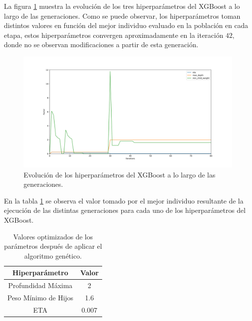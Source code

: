 \documentclass{uathesis-es}
\begin{document}
{La figura \ref{EvolucionHiperparametrosImage} muestra la evolución de  los tres hiperparámetros del XGBoost a lo largo de las generaciones. Como se puede observar, los hiperparámetros toman distintos valores en función del mejor individuo evaluado en la población en cada etapa, estos hiperparámetros convergen aproximadamente en la iteración $42$, donde no se observan modificaciones a partir de esta generación.

 \begin{figure}[H]
	     \centering
	     \includegraphics[width=14cm]{Figures/1stPaper/EvolutionH.png}
	     \caption{Evolución de los hiperparámetros del XGBoost a lo largo de las generaciones.}
	     \label{EvolucionHiperparametrosImage}
 \end{figure}

En la tabla \ref{BestGASolutionTable} se observa el valor tomado por el mejor individuo resultante de la ejecución de las distintas generaciones para cada uno de los hiperparámetros del XGBoost. 

\begin{table}[h]
	\centering
	\begin{tabular}{ |c|c| } 
		\hline
		\textbf{Hiperparámetro} & \textbf{Valor}\\
		\hline
		Profundidad Máxima & 2 \\
		Peso Mínimo de Hijos & 1.6 \\ 
		ETA & 0.007 \\
		\hline
	\end{tabular}
	\caption{Valores optimizados de los parámetros después de aplicar el algoritmo genético.}
	\label{BestGASolutionTable}
\end{table}

}
\end{document}
